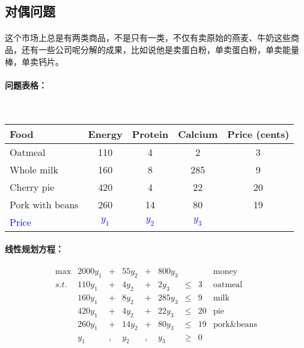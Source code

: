         
    \subsection{对偶问题}
    	\paragraph{}这个市场上总是有两类商品，不是只有一类，不仅有卖原始的燕麦、牛奶这些商品，还有一些公司呢分解的成果，比如说他是卖蛋白粉，单卖蛋白粉，单卖能量棒，单卖钙片。
    	\paragraph{问题表格：}
            \ \\     		
    		\begin{table}[h]   
    			\centering
    			\begin{tabular}{l|ccc|c}\hline
       				Food & Energy & Protein & Calcium  & Price (cents) \\
 					\hline
 					Oatmeal & 110 & 4 & 2 & 3 \\
					Whole milk & 160 & 8 & 285 & 9 \\
 					Cherry pie & 420 & 4 & 22 & 20 \\
 					Pork with beans & 260 & 14 & 80 & 19 \\    \hline
					\textcolor{blue}{ Price} & \textcolor{blue}{$y_1$} & \textcolor{blue}{$y_2$} & \textcolor{blue}{$y_3$} &   \\
					\hline
     			\end{tabular}
 			\end{table}
    	\paragraph{线性规划方程：}
    		\[
			\begin{array}{rrrrrrrrl}
 			\max & 2000 y_1   &+& 55 y_2   &+& 800 y_3 & &  &\text{money}   \\
			 s.t. & 110 y_1 &+& 4 y_2 &+& 2 y_3   & \leq &3 & \text{oatmeal} \\
  		     & 160 y_1 &+& 8 y_2 &+& 285 y_3 & \leq &9 & \text{milk} \\
   		     & 420 y_1 &+& 4 y_2 &+& 22 y_3  & \leq &20 & \text{pie} \\
             & 260 y_1 &+& 14 y_2 &+& 80 y_3  & \leq &19 & \text{pork\&beans} \\
             &     y_1 &,&    y_2 &,&    y_3  &  \geq & 0 \\ 		
			\end{array} \nonumber
			\]
